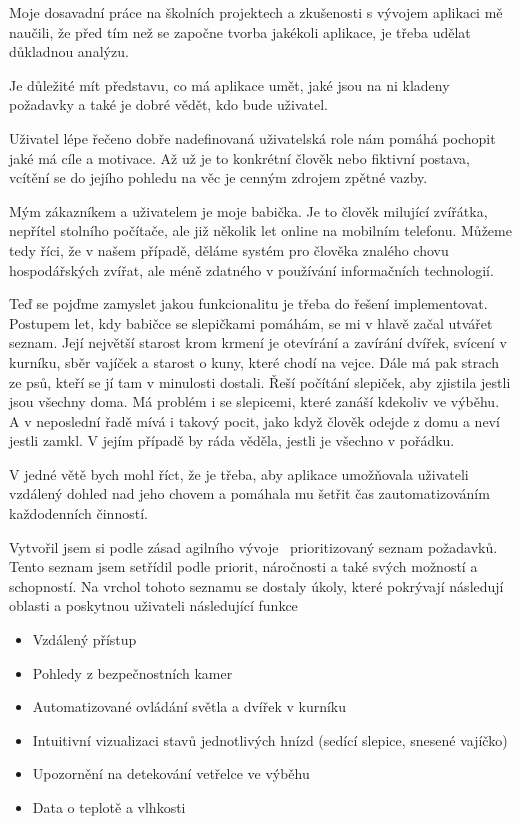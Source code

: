 Moje dosavadní práce na školních projektech a zkušenosti s vývojem aplikaci mě naučili, že před tím než se započne tvorba jakékoli aplikace, je třeba udělat důkladnou analýzu.

Je důležité mít představu, co má aplikace umět, jaké jsou na ni kladeny požadavky a také je dobré vědět, kdo bude uživatel.

Uživatel lépe řečeno dobře nadefinovaná uživatelská role nám pomáhá pochopit jaké má cíle a motivace.
Až už je to konkrétní člověk nebo fiktivní postava, vcítění se do jejího pohledu na věc je cenným zdrojem zpětné vazby.

Mým zákazníkem a uživatelem je moje babička.
Je to člověk milující zvířátka, nepřítel stolního počítače, ale již několik let online na mobilním telefonu.
Můžeme tedy říci, že v našem případě, děláme systém pro člověka znalého chovu hospodářských zvířat, ale méně zdatného v používání informačních technologií.

Teď se pojďme zamyslet jakou funkcionalitu je třeba do řešení implementovat.
Postupem let, kdy babičce se slepičkami pomáhám, se mi v hlavě začal utvářet seznam.
Její největší starost krom krmení je otevírání a zavírání dvířek, svícení v kurníku, sběr vajíček a starost o kuny, které chodí na vejce.
Dále má pak strach ze psů, kteří se jí tam v minulosti dostali.
Řeší počítání slepiček, aby zjistila jestli jsou všechny doma.
Má problém i se slepicemi, které zanáší kdekoliv ve výběhu.
A v neposlední řadě mívá i takový pocit, jako když člověk odejde z domu a neví jestli zamkl.
V jejím případě by ráda věděla, jestli je všechno v pořádku.

V jedné větě bych mohl říct, že je třeba, aby aplikace umožňovala uživateli vzdálený dohled nad jeho chovem a pomáhala mu šetřit čas zautomatizováním každodenních činností.

Vytvořil jsem si podle zásad agilního vývoje~\cite{agile-manifesto} prioritizovaný seznam požadavků.
Tento seznam jsem setřídil podle priorit, náročnosti a také svých možností a schopností.
Na vrchol tohoto seznamu se dostaly úkoly, které pokrývají následují oblasti a poskytnou uživateli následující funkce

\begin{itemize}
    \item Vzdálený přístup
    \item Pohledy z bezpečnostních kamer
    \item Automatizované ovládání světla a dvířek v kurníku
    \item Intuitivní vizualizaci stavů jednotlivých hnízd (sedící slepice, snesené vajíčko)
    \item Upozornění na detekování vetřelce ve výběhu
    \item Data o teplotě a vlhkosti
\end{itemize}


\newpage